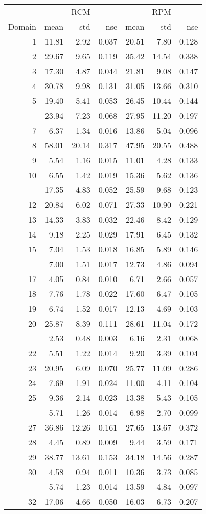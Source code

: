 
\begin{tabular}[t]{rrrrrrr}
\toprule
\multicolumn{1}{c}{ } & \multicolumn{3}{c}{RCM} & \multicolumn{3}{c}{RPM} \\
\cmidrule(l{3pt}r{3pt}){2-4} \cmidrule(l{3pt}r{3pt}){5-7}
Domain & mean & std & nse & mean & std & nse\\
\midrule
1 & 11.81 & 2.92 & 0.037 & 20.51 & 7.80 & 0.128\\
2 & 29.67 & 9.65 & 0.119 & 35.42 & 14.54 & 0.338\\
3 & 17.30 & 4.87 & 0.044 & 21.81 & 9.08 & 0.147\\
4 & 30.78 & 9.98 & 0.131 & 31.05 & 13.66 & 0.310\\
5 & 19.40 & 5.41 & 0.053 & 26.45 & 10.44 & 0.144\\
\addlinespace
6 & 23.94 & 7.23 & 0.068 & 27.95 & 11.20 & 0.197\\
7 & 6.37 & 1.34 & 0.016 & 13.86 & 5.04 & 0.096\\
8 & 58.01 & 20.14 & 0.317 & 47.95 & 20.55 & 0.488\\
9 & 5.54 & 1.16 & 0.015 & 11.01 & 4.28 & 0.133\\
10 & 6.55 & 1.42 & 0.019 & 15.36 & 5.62 & 0.136\\
\addlinespace
11 & 17.35 & 4.83 & 0.052 & 25.59 & 9.68 & 0.123\\
12 & 20.84 & 6.02 & 0.071 & 27.33 & 10.90 & 0.221\\
13 & 14.33 & 3.83 & 0.032 & 22.46 & 8.42 & 0.129\\
14 & 9.18 & 2.25 & 0.029 & 17.91 & 6.45 & 0.132\\
15 & 7.04 & 1.53 & 0.018 & 16.85 & 5.89 & 0.146\\
\addlinespace
16 & 7.00 & 1.51 & 0.017 & 12.73 & 4.86 & 0.094\\
17 & 4.05 & 0.84 & 0.010 & 6.71 & 2.66 & 0.057\\
18 & 7.76 & 1.78 & 0.022 & 17.60 & 6.47 & 0.105\\
19 & 6.74 & 1.52 & 0.017 & 12.13 & 4.69 & 0.103\\
20 & 25.87 & 8.39 & 0.111 & 28.61 & 11.04 & 0.172\\
\addlinespace
21 & 2.53 & 0.48 & 0.003 & 6.16 & 2.31 & 0.068\\
22 & 5.51 & 1.22 & 0.014 & 9.20 & 3.39 & 0.104\\
23 & 20.95 & 6.09 & 0.070 & 25.77 & 11.09 & 0.286\\
24 & 7.69 & 1.91 & 0.024 & 11.00 & 4.11 & 0.104\\
25 & 9.36 & 2.14 & 0.023 & 13.38 & 5.43 & 0.105\\
\addlinespace
26 & 5.71 & 1.26 & 0.014 & 6.98 & 2.70 & 0.099\\
27 & 36.86 & 12.26 & 0.161 & 27.65 & 13.67 & 0.372\\
28 & 4.45 & 0.89 & 0.009 & 9.44 & 3.59 & 0.171\\
29 & 38.77 & 13.61 & 0.153 & 34.18 & 14.56 & 0.287\\
30 & 4.58 & 0.94 & 0.011 & 10.36 & 3.73 & 0.085\\
\addlinespace
31 & 5.74 & 1.23 & 0.014 & 13.59 & 4.84 & 0.097\\
32 & 17.06 & 4.66 & 0.050 & 16.03 & 6.73 & 0.207\\
\bottomrule
\end{tabular}
